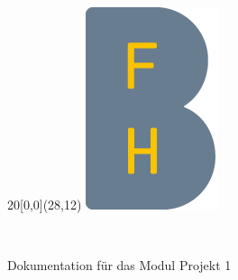 %
%

\begin{titlepage}


\setlength{\unitlength}{1mm}
\begin{textblock}{20}[0,0](28,12)
	\includegraphics[scale=1.0]{images/BFH_Logo_B.png}
\end{textblock}
\color{black}

\begin{flushleft}

\vspace*{21mm}

\fontsize{26pt}{40pt}\selectfont 
\titel 				\\							%
\vspace{2mm}

\fontsize{16pt}{24pt}\selectfont\vspace{0.3em}
Dokumentation für das Modul Projekt 1 			\\							%
\vspace{5mm}




\end{flushleft}
\end{titlepage}
